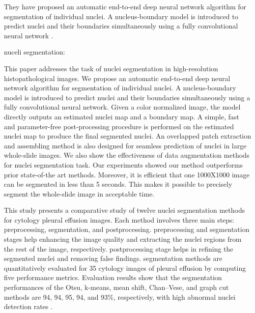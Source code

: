 \documentclass{comjnl}
\begin{document}
They have proposed an automatic end-to-end deep neural network algorithm for segmentation of individual nuclei. A nucleus-boundary model is introduced to predict nuclei and their boundaries simultaneously using a fully convolutional neural network \cite{cui2019deep}. 

nuceli segmentation:


This paper addresses the task of nuclei segmentation
in high-resolution histopathological images. We propose an automatic end-to-end deep neural network algorithm for segmentation of individual nuclei. A nucleus-boundary model is introduced
to predict nuclei and their boundaries simultaneously using a
fully convolutional neural network. Given a color normalized
image, the model directly outputs an estimated nuclei map and a
boundary map. A simple, fast and parameter-free post-processing
procedure is performed on the estimated nuclei map to produce
the final segmented nuclei. An overlapped patch extraction and
assembling method is also designed for seamless prediction of
nuclei in large whole-slide images. We also show the effectiveness
of data augmentation methods for nuclei segmentation task. Our
experiments showed our method outperforms prior state-of-the art methods. Moreover, it is efficient that one 1000X1000 image
can be segmented in less than 5 seconds. This makes it possible
to precisely segment the whole-slide image in acceptable time.


This study presents a comparative study of twelve nuclei segmentation methods for cytology pleural effusion images. Each method involves three main steps: preprocessing, segmentation, and postprocessing. preprocessing and segmentation stages help enhancing the image quality and extracting the nuclei regions from the rest of the image, respectively. postprocessing stage helps in refining the segmented nuclei and removing false findings. segmentation methods are quantitatively evaluated for 35 cytology images of pleural effusion by computing five performance metrics. Evaluation results show that the segmentation performances of the Otsu, k-means, mean shift, Chan–Vese, and graph cut methods are 94, 94, 95, 94, and 93\%, respectively, with high abnormal nuclei detection rates \cite{win2018comparative}.
\end{document}
